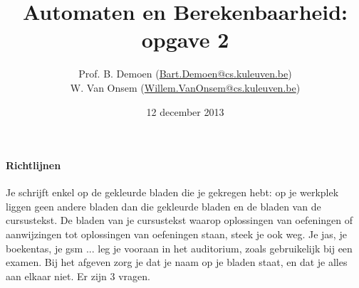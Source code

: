\documentclass[fleqn]{article}
\title{Automaten en Berekenbaarheid:\\opgave 2}
\author{Prof. B. Demoen (\url{Bart.Demoen@cs.kuleuven.be})\\ W. Van Onsem (\url{Willem.VanOnsem@cs.kuleuven.be})}
\date{12 december 2013}
\begin{document}
\maketitle
\paragraph{Richtlijnen}

Je schrijft enkel op de gekleurde bladen die je gekregen hebt: op je
werkplek liggen geen andere bladen dan die gekleurde bladen en de
bladen van de cursustekst. De bladen van je cursustekst waarop
oplossingen van oefeningen of aanwijzingen tot oplossingen van
oefeningen staan, steek je ook weg. Je jas, je boekentas, je gsm
... leg je vooraan in het auditorium, zoals gebruikelijk bij een
examen. Bij het afgeven zorg je dat je naam op je bladen staat, en dat
je alles aan elkaar niet. Er zijn 3 vragen.
\end{document}
